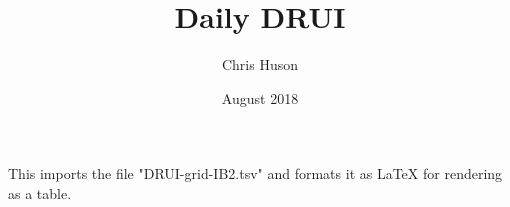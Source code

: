 \documentclass[12pt, oneside]{article}
\title{Daily DRUI}
\author{Chris Huson}
\date{August 2018}
\begin{document}
This imports the file "DRUI-grid-IB2.tsv" and formats it as LaTeX for rendering as a table.

\end{document}
